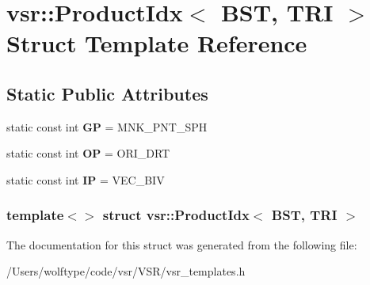 \hypertarget{structvsr_1_1_product_idx_3_01_b_s_t_00_01_t_r_i_01_4}{\section{vsr\-:\-:Product\-Idx$<$ B\-S\-T, T\-R\-I $>$ Struct Template Reference}
\label{structvsr_1_1_product_idx_3_01_b_s_t_00_01_t_r_i_01_4}
}
\subsection*{Static Public Attributes}
\begin{DoxyCompactItemize}
\item 
\hypertarget{structvsr_1_1_product_idx_3_01_b_s_t_00_01_t_r_i_01_4_add439c2aa82c7612f7d3df6891bd9e26}{static const int {\bfseries G\-P} = M\-N\-K\-\_\-\-P\-N\-T\-\_\-\-S\-P\-H}\label{structvsr_1_1_product_idx_3_01_b_s_t_00_01_t_r_i_01_4_add439c2aa82c7612f7d3df6891bd9e26}

\item 
\hypertarget{structvsr_1_1_product_idx_3_01_b_s_t_00_01_t_r_i_01_4_ab1d62ab925516c0802486dae4e220d5e}{static const int {\bfseries O\-P} = O\-R\-I\-\_\-\-D\-R\-T}\label{structvsr_1_1_product_idx_3_01_b_s_t_00_01_t_r_i_01_4_ab1d62ab925516c0802486dae4e220d5e}

\item 
\hypertarget{structvsr_1_1_product_idx_3_01_b_s_t_00_01_t_r_i_01_4_a1876617cd5c601892107ae8132e9a8ad}{static const int {\bfseries I\-P} = V\-E\-C\-\_\-\-B\-I\-V}\label{structvsr_1_1_product_idx_3_01_b_s_t_00_01_t_r_i_01_4_a1876617cd5c601892107ae8132e9a8ad}

\end{DoxyCompactItemize}
\subsubsection*{template$<$$>$ struct vsr\-::\-Product\-Idx$<$ B\-S\-T, T\-R\-I $>$}



The documentation for this struct was generated from the following file\-:\begin{DoxyCompactItemize}
\item 
/\-Users/wolftype/code/vsr/\-V\-S\-R/vsr\-\_\-templates.\-h\end{DoxyCompactItemize}
